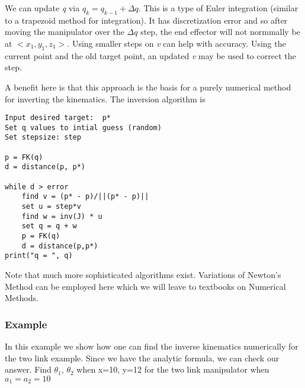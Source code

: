 We can update \emph{q} via \(q_k = q_{k-1} + \Delta q\). This is a type
of Euler integration (similar to a trapezoid method for integration). It
has discretization error and so after moving the manipulator over the
\(\Delta q\) step, the end effector will not normmally be at
\(<x_1,y_1,z_1>\). Using smaller steps on \emph{v} can help with
accuracy. Using the current point and the old target point, an updated
\emph{v} may be used to correct the step.

A benefit here is that this approach is the basis for a purely numerical
method for inverting the kinematics. The inversion algorithm is

\begin{verbatim}
Input desired target:  p*
Set q values to intial guess (random)
Set stepsize: step

p = FK(q)
d = distance(p, p*)

while d > error
    find v = (p* - p)/||(p* - p)||
    set u = step*v
    find w = inv(J) * u
    set q = q + w
    p = FK(q)
    d = distance(p,p*)
print("q = ", q)
\end{verbatim}

Note that much more sophisticated algorithms exist. Variations of
Newton's Method can be employed here which we will leave to textbooks on
Numerical Methods.

\hypertarget{example}{%
\subsubsection{Example}\label{example}}

In this example we show how one can find the inverse kinematics
numerically for the two link example. Since we have the analytic
formula, we can check our answer. Find \(\theta_1\), \(\theta_2\) when
x=10, y=12 for the two link manipulator when \(a_1=a_2=10\)

